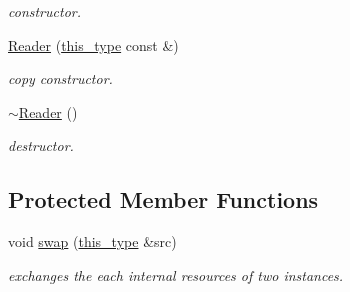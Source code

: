 \begin{DoxyCompactItemize}
\begin{DoxyCompactList}\small\item\em constructor. \end{DoxyCompactList}\item 
\hypertarget{classhryky_1_1http_1_1header_1_1content_1_1_reader_aaef690ee658fe791fd40527ed2f39715}{\hyperlink{classhryky_1_1http_1_1header_1_1content_1_1_reader_aaef690ee658fe791fd40527ed2f39715}{Reader} (\hyperlink{classhryky_1_1http_1_1header_1_1content_1_1_reader_a1041bb4633368aa6791460aa794e6ea9}{this\-\_\-type} const \&)}\label{classhryky_1_1http_1_1header_1_1content_1_1_reader_aaef690ee658fe791fd40527ed2f39715}

\begin{DoxyCompactList}\small\item\em copy constructor. \end{DoxyCompactList}\item 
\hypertarget{classhryky_1_1http_1_1header_1_1content_1_1_reader_aa80083f0387c9e0404a49b0bbf135855}{\hyperlink{classhryky_1_1http_1_1header_1_1content_1_1_reader_aa80083f0387c9e0404a49b0bbf135855}{$\sim$\-Reader} ()}\label{classhryky_1_1http_1_1header_1_1content_1_1_reader_aa80083f0387c9e0404a49b0bbf135855}

\begin{DoxyCompactList}\small\item\em destructor. \end{DoxyCompactList}\end{DoxyCompactItemize}
\subsection*{Protected Member Functions}
\begin{DoxyCompactItemize}
\item 
\hypertarget{classhryky_1_1http_1_1header_1_1content_1_1_reader_afdf841948c19644e0879cdf2e1bf2854}{void \hyperlink{classhryky_1_1http_1_1header_1_1content_1_1_reader_afdf841948c19644e0879cdf2e1bf2854}{swap} (\hyperlink{classhryky_1_1http_1_1header_1_1content_1_1_reader_a1041bb4633368aa6791460aa794e6ea9}{this\-\_\-type} \&src)}\label{classhryky_1_1http_1_1header_1_1content_1_1_reader_afdf841948c19644e0879cdf2e1bf2854}

\begin{DoxyCompactList}\small\item\em exchanges the each internal resources of two instances. \end{DoxyCompactList}\end{DoxyCompactItemize}


